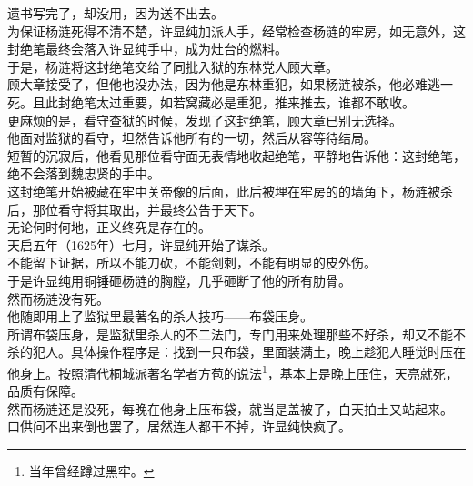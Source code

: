 \begin{multicols}{\theparacolNo}
遗书写完了，却没用，因为送不出去。\\

为保证杨涟死得不清不楚，许显纯加派人手，经常检查杨涟的牢房，如无意外，这封绝笔最终会落入许显纯手中，成为灶台的燃料。\\

于是，杨涟将这封绝笔交给了同批入狱的东林党人顾大章。\\

顾大章接受了，但他也没办法，因为他是东林重犯，如果杨涟被杀，他必难逃一死。且此封绝笔太过重要，如若窝藏必是重犯，推来推去，谁都不敢收。\\

更麻烦的是，看守查狱的时候，发现了这封绝笔，顾大章已别无选择。\\

他面对监狱的看守，坦然告诉他所有的一切，然后从容等待结局。\\

短暂的沉寂后，他看见那位看守面无表情地收起绝笔，平静地告诉他：这封绝笔，绝不会落到魏忠贤的手中。\\

这封绝笔开始被藏在牢中关帝像的后面，此后被埋在牢房的的墙角下，杨涟被杀后，那位看守将其取出，并最终公告于天下。\\

无论何时何地，正义终究是存在的。\\

天启五年（1625年）七月，许显纯开始了谋杀。\\

不能留下证据，所以不能刀砍，不能剑刺，不能有明显的皮外伤。\\

于是许显纯用铜锤砸杨涟的胸膛，几乎砸断了他的所有肋骨。\\

然而杨涟没有死。\\

他随即用上了监狱里最著名的杀人技巧——布袋压身。\\

所谓布袋压身，是监狱里杀人的不二法门，专门用来处理那些不好杀，却又不能不杀的犯人。具体操作程序是：找到一只布袋，里面装满土，晚上趁犯人睡觉时压在他身上。按照清代桐城派著名学者方苞的说法\footnote{当年曾经蹲过黑牢。}，基本上是晚上压住，天亮就死，品质有保障。\\

然而杨涟还是没死，每晚在他身上压布袋，就当是盖被子，白天拍土又站起来。\\

口供问不出来倒也罢了，居然连人都干不掉，许显纯快疯了。\\


\end{multicols}
